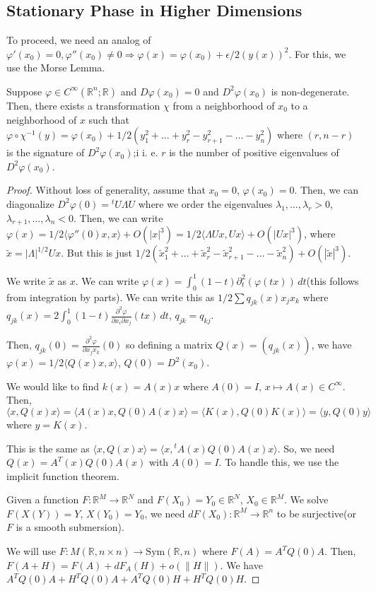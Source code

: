 \documentclass[12pt]{scrartcl}
\newcommand{\R}{\mathbb{R}}
\newcommand{\<}{\langle}
\renewcommand{\>}{\rangle}
\let \phi \varphi
\begin{document}
\subsection{Stationary Phase in Higher Dimensions}
To proceed, we need an analog of $\phi'(x_0) = 0, \phi''(x_0) \ne 0 \Rightarrow \phi(x) = \phi(x_0) + \epsilon/2(y(x))^2$.  For this, we use the Morse Lemma.
\begin{theorem} Suppose $\phi \in C^\infty(\R^n; \R)$ and $D\phi(x_0) = 0$ and $D^2\phi(x_0) $ is non-degenerate.  Then, there exists a transformation $\chi$ from a neighborhood of $x_0$ to a neighborhood of $x$ such that $\phi \circ \chi^{-1}(y) = \phi(x_0) + 1/2 (y_1^2 + \dots + y_r^2 - y_{r+1}^2 - \dots - y_n^2)$ where $(r, n-r)$ is the signature of $D^2\phi(x_0)$;i i. e. $r$ is the number of positive eigenvalues of $D^2 \phi(x_0)$. 
\end{theorem}
\begin{proof}
Without loss of generality, assume that $x_0 = 0$, $\phi(x_0) = 0$.  Then, we can diagonalize $D^2 \phi(0) = {}^t U \Lambda U$ where we order the eigenvalues $\lambda_1, \dots, \lambda_r > 0$, $\lambda_{r+1}, \dots, \lambda_n < 0$.  Then, we can write $\phi(x) = 1/2\<\phi''(0)x, x\> + O(|x|^3) = 1/2 \<\Lambda U x, U x\> + O(|Ux|^3)$, where $\tilde{x} = |\Lambda|^{1/2} U x$.  But this is just $1/2(\tilde{x}_1^2 + \dots + \tilde{x}_r^2 - \tilde{x}_{r+1}^2 - \dots - \tilde{x}_{n}^2) + O(|\tilde{x}|^3)$.

We write $\tilde{x}$ as $x$.  We can write $\phi(x) = \int_0^1 (1 - t)\partial_t^2(\phi(tx))\,dt$(this follows from integration by parts).  We can write this as $1/2 \sum q_{jk}(x) x_j x_k$ where $q_{jk}(x) = 2 \int_0^1 (1 - t) \frac{\partial^2 \phi}{\partial x_i \partial x_j}(tx)\,dt$, $q_{jk}  = q_{kj}$.

Then, $q_{jk}(0) = \frac{\partial^2\phi}{\partial x_j x_k}(0)$ so defining a matrix $Q(x) = (q_{jk}(x))$, we have $\phi(x) = 1/2 \<Q(x) x, x\>$, $Q(0) = D^2(x_0)$.  

We would like to find $k(x) = A(x) x$ where $A(0) = I$, $x \mapsto A(x) \in C^\infty$.  Then, $\<x, Q(x)x\> = \<A(x)x, Q(0) A(x)x\> = \<K(x), Q(0)K(x)\> = \<y, Q(0) y\>$ where $y = K(x)$.

This is the same as $\<x, Q(x) x\> = \<x, {}^t A(x) Q(0) A(x)x\>$.  So, we need $Q(x) = A^T(x)Q(0)A(x)$ with $A(0) = I$.  To handle this, we use the implicit function theorem.  

\begin{theorem} Given a function $F: \R^M \to \R^N$ and $F(X_0) = Y_0 \in \R^N$, $X_0 \in \R^M$.  We solve $F(X(Y)) = Y$, $X(Y_0) = Y_0$, we need $dF(X_0): \R^M \to \R^n$ to be surjective(or $F$ is a smooth submersion).
\end{theorem}

We will use $F: M(\R, n \times n) \to \text{Sym}(\R, n)$ where $F(A) = A^T Q(0) A$.  Then, $F(A + H) = F(A) + dF_A(H) + o(\|H\|)$.  We have $A^TQ(0)A + H^TQ(0)A + A^T Q(0)H + H^T Q(0)H$.  
\end{proof}
\end{document}
